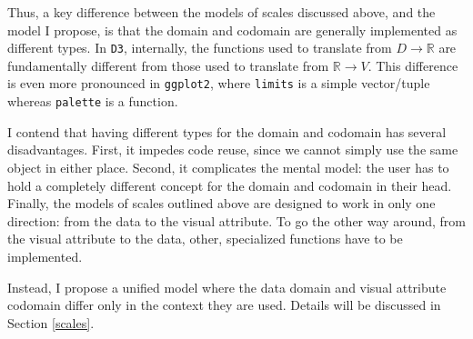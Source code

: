 \documentclass[
  openany]{book}
\newenvironment{Shaded}{\begin{snugshade}}{\end{snugshade}}
\newcommand{\AttributeTok}[1]{\textcolor[rgb]{0.13,0.29,0.53}{#1}}
\newcommand{\CommentTok}[1]{\textcolor[rgb]{0.56,0.35,0.01}{\textit{#1}}}
\newcommand{\ControlFlowTok}[1]{\textcolor[rgb]{0.13,0.29,0.53}{\textbf{#1}}}
\newcommand{\FunctionTok}[1]{\textcolor[rgb]{0.13,0.29,0.53}{\textbf{#1}}}
\newcommand{\NormalTok}[1]{#1}
\newcommand{\OtherTok}[1]{\textcolor[rgb]{0.56,0.35,0.01}{#1}}
\newcommand{\SpecialCharTok}[1]{\textcolor[rgb]{0.81,0.36,0.00}{\textbf{#1}}}
\theoremstyle{definition}
\theoremstyle{definition}
\theoremstyle{definition}
\theoremstyle{definition}
\theoremstyle{remark}
\begin{document}
\begin{Shaded}
\end{Shaded}

Thus, a key difference between the models of scales discussed above, and the model I propose, is that the domain and codomain are generally implemented as different types. In \texttt{D3}, internally, the functions used to translate from \(D \to \mathbb{R}\) are fundamentally different from those used to translate from \(\mathbb{R} \to V\). This difference is even more pronounced in \texttt{ggplot2}, where \texttt{limits} is a simple vector/tuple whereas \texttt{palette} is a function.

I contend that having different types for the domain and codomain has several disadvantages. First, it impedes code reuse, since we cannot simply use the same object in either place. Second, it complicates the mental model: the user has to hold a completely different concept for the domain and codomain in their head. Finally, the models of scales outlined above are designed to work in only one direction: from the data to the visual attribute. To go the other way around, from the visual attribute to the data, other, specialized functions have to be implemented.

Instead, I propose a unified model where the data domain and visual attribute codomain differ only in the context they are used. Details will be discussed in Section \ref{scales}.
\end{document}
